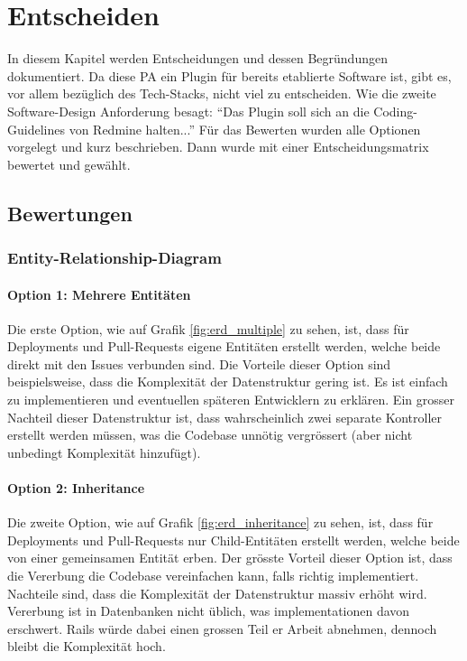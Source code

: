 \chapter{Entscheiden}
\label{chap:decide}
In diesem Kapitel werden Entscheidungen und dessen Begründungen dokumentiert. \newline
Da diese PA ein Plugin für bereits etablierte Software ist, gibt es, vor allem bezüglich des Tech-Stacks, nicht viel zu
entscheiden. Wie die zweite Software-Design Anforderung besagt: \enquote{Das Plugin soll sich an die Coding-Guidelines von
Redmine halten...} \newline
Für das Bewerten wurden alle Optionen vorgelegt und kurz beschrieben. Dann wurde mit einer Entscheidungsmatrix
bewertet und gewählt.

\section{Bewertungen}
\subsection{Entity-Relationship-Diagram}
\subsubsection{Option 1: Mehrere Entitäten}
Die erste Option, wie auf Grafik \ref{fig:erd_multiple} zu sehen, ist, dass für Deployments und Pull-Requests
eigene Entitäten erstellt werden, welche beide direkt mit den Issues verbunden sind. \newline
Die Vorteile dieser Option sind beispielsweise, dass die Komplexität der Datenstruktur gering ist. Es ist einfach zu
implementieren und eventuellen späteren Entwicklern zu erklären. \newline
Ein grosser Nachteil dieser Datenstruktur ist, dass wahrscheinlich zwei separate Kontroller erstellt werden müssen, was
die Codebase unnötig vergrössert (aber nicht unbedingt Komplexität hinzufügt).

\subsubsection{Option 2: Inheritance}
Die zweite Option, wie auf Grafik \ref{fig:erd_inheritance} zu sehen, ist, dass für Deployments und Pull-Requests nur
Child-Entitäten erstellt werden, welche beide von einer gemeinsamen Entität erben. \newline
Der grösste Vorteil dieser Option ist, dass die Vererbung die Codebase vereinfachen kann, falls richtig implementiert.
\newline
Nachteile sind, dass die Komplexität der Datenstruktur massiv erhöht wird. Vererbung ist in Datenbanken nicht üblich, was
implementationen davon erschwert. Rails würde dabei einen grossen Teil er Arbeit abnehmen, dennoch bleibt die Komplexität
hoch.


